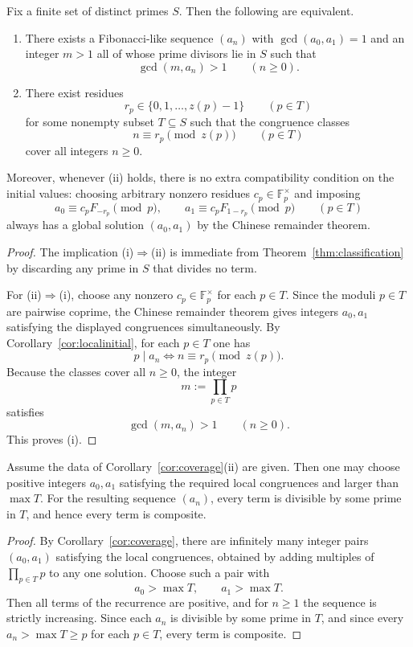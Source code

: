 \begin{corollary}\label{cor:coverage}
Fix a finite set of distinct primes $S$. Then the following are equivalent.
\begin{enumerate}
\item[(i)] There exists a Fibonacci-like sequence $(a_n)$ with $\gcd(a_0,a_1)=1$ and an integer $m>1$ all of whose prime divisors lie in $S$ such that
\[
\gcd(m,a_n)>1 \qquad (n\ge 0).
\]
\item[(ii)] There exist residues
\[
r_p\in\{0,1,\dots,z(p)-1\} \qquad (p\in T)
\]
for some nonempty subset $T\subseteq S$ such that the congruence classes
\[
n\equiv r_p\pmod{z(p)} \qquad (p\in T)
\]
cover all integers $n\ge 0$.
\end{enumerate}
Moreover, whenever \textup{(ii)} holds, there is no extra compatibility condition on the initial values: choosing arbitrary nonzero residues $c_p\in\mathbb F_p^{\times}$ and imposing
\[
a_0\equiv c_pF_{-r_p}\pmod p,
\qquad
 a_1\equiv c_pF_{1-r_p}\pmod p
\qquad (p\in T)
\]
always has a global solution $(a_0,a_1)$ by the Chinese remainder theorem.
\end{corollary}
\begin{proof}
The implication \textup{(i)}$\Rightarrow$\textup{(ii)} is immediate from Theorem~\ref{thm:classification} by discarding any prime in $S$ that divides no term.

For \textup{(ii)}$\Rightarrow$\textup{(i)}, choose any nonzero $c_p\in\mathbb F_p^{\times}$ for each $p\in T$. Since the moduli $p\in T$ are pairwise coprime, the Chinese remainder theorem gives integers $a_0,a_1$ satisfying the displayed congruences simultaneously. By Corollary~\ref{cor:localinitial}, for each $p\in T$ one has
\[
p\mid a_n \iff n\equiv r_p\pmod{z(p)}.
\]
Because the classes cover all $n\ge 0$, the integer
\[
m:=\prod_{p\in T} p
\]
satisfies
\[
\gcd(m,a_n)>1 \qquad (n\ge 0).
\]
This proves \textup{(i)}.
\end{proof}

\begin{corollary}\label{cor:grahamrealisation}
Assume the data of Corollary~\ref{cor:coverage}(ii) are given. Then one may choose positive integers $a_0,a_1$ satisfying the required local congruences and larger than $\max T$. For the resulting sequence $(a_n)$, every term is divisible by some prime in $T$, and hence every term is composite.
\end{corollary}
\begin{proof}
By Corollary~\ref{cor:coverage}, there are infinitely many integer pairs $(a_0,a_1)$ satisfying the local congruences, obtained by adding multiples of $\prod_{p\in T}p$ to any one solution. Choose such a pair with
\[
a_0>\max T,
\qquad
 a_1>\max T.
\]
Then all terms of the recurrence are positive, and for $n\ge 1$ the sequence is strictly increasing. Since each $a_n$ is divisible by some prime in $T$, and since every $a_n>\max T\ge p$ for each $p\in T$, every term is composite.
\end{proof}

